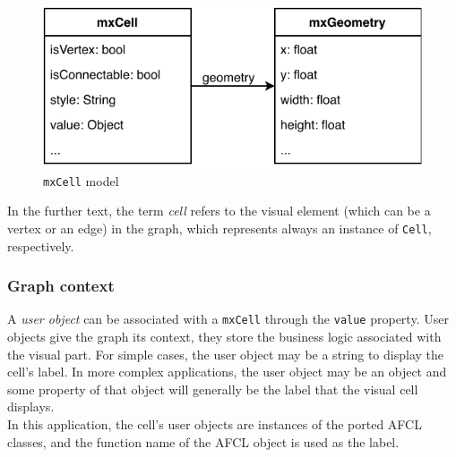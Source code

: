 \documentclass[a4paper,top=25mm,bottom=25mm,12pt,pdftex,halfparskip,twoside,bibtotoc,numbers=noenddot]{scrbook}
\begin{document}
\begin{figure}[H]
  \centering
  \vspace{0.8cm}
  \includegraphics[]{mxCell}
  \caption{\texttt{mxCell} model}
\end{figure}

In the further text, the term \textit{cell} refers to the visual element (which can be a vertex or an edge) in the graph, which represents always an instance of \texttt{Cell}, respectively.

\subsubsection{Graph context}


A \textit{user object} can be associated with a \texttt{mxCell} through the \texttt{value} property. User objects give the graph its context, they store the business logic associated with the visual part. \cite{manuals-mxgraph-user-manual} For simple cases, the user object may be a string to display the cell's label. In more complex applications, the user object may be an object and some property of that object will generally be the label that the visual cell displays.\\
In this application, the cell's user objects are instances of the ported AFCL classes, and the function name of the AFCL object is used as the label.
\end{document}

